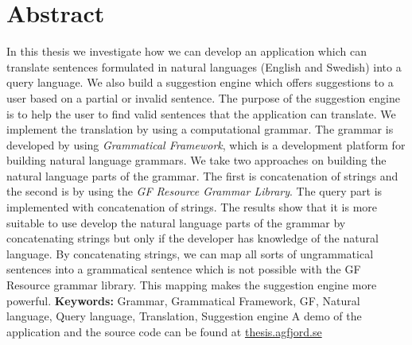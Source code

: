 \begingroup
\let\clearpage\relax
\let\cleardoublepage\relax
\let\cleardoublepage\relax

\chapter*{Abstract}
In this thesis we investigate how we can develop an application which can translate sentences formulated in natural languages (English and Swedish) into a query language. We also build a suggestion engine which offers suggestions to a user based on a partial or invalid sentence. The purpose of the suggestion engine is to help the user to find valid sentences that the application can translate.
\newline
\newline
We implement the translation by using a computational grammar. The grammar is developed by using \emph{Grammatical Framework}, which is a development platform for building natural language grammars. We take two approaches on building the natural language parts of the grammar. The first is concatenation of strings and the second is by using the \emph{GF Resource Grammar Library}. The query part is implemented with concatenation of strings.
\newline
\newline
The results show that it is more suitable to use develop the natural language parts of the grammar by concatenating strings but only if the developer has  knowledge of the natural language. By concatenating strings, we can map all sorts of ungrammatical sentences into a grammatical sentence which is not possible with the GF Resource grammar library. This mapping makes the suggestion engine more powerful.
\newline
\newline
\textbf{Keywords:} Grammar, Grammatical Framework, GF, Natural language, Query language, Translation, Suggestion engine
\newline
\newline
A demo of the application and the source code can be found at \href{http://thesis.agfjord.se/}{thesis.agfjord.se}

\endgroup			

\vfill
